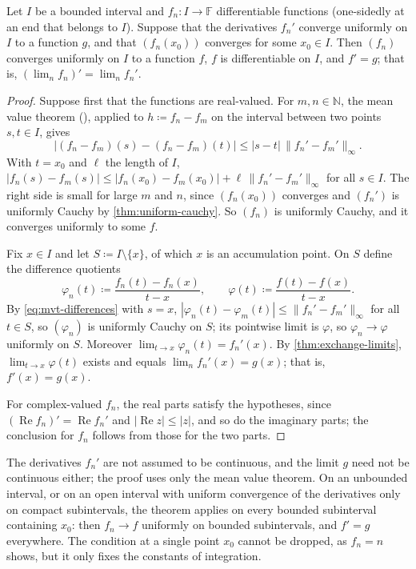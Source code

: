 \begin{theorem}
\label{thm:uniform-derivative}
Let $I$ be a bounded interval and $f_n\colon I\to\mathbb F$ differentiable functions (one-sidedly at an end that belongs to $I$). Suppose that the derivatives $f_n'$ converge uniformly on $I$ to a function $g$, and that $(f_n(x_0))$ converges for some $x_0\in I$. Then $(f_n)$ converges uniformly on $I$ to a function $f$, $f$ is differentiable on $I$, and $f'=g$; that is, $(\lim_nf_n)'=\lim_nf_n'$.
\end{theorem}

\begin{proof}
Suppose first that the functions are real-valued. For $m,n\in\mathbb N$, the mean value theorem (), applied to $h\coloneqq f_n-f_m$ on the interval between two points $s,t\in I$, gives
\begin{equation}
\bigl|(f_n-f_m)(s)-(f_n-f_m)(t)\bigr|\le|s-t|\,\|f_n'-f_m'\|_\infty .
\label{eq:mvt-differences}
\end{equation}
With $t=x_0$ and $\ell$ the length of $I$, $|f_n(s)-f_m(s)|\le|f_n(x_0)-f_m(x_0)|+\ell\,\|f_n'-f_m'\|_\infty$ for all $s\in I$. The right side is small for large $m$ and $n$, since $(f_n(x_0))$ converges and $(f_n')$ is uniformly Cauchy by \cref{thm:uniform-cauchy}. So $(f_n)$ is uniformly Cauchy, and it converges uniformly to some $f$.

Fix $x\in I$ and let $S\coloneqq I\setminus\{x\}$, of which $x$ is an accumulation point. On $S$ define the difference quotients
\[
\varphi_n(t)\coloneqq\frac{f_n(t)-f_n(x)}{t-x},\qquad\varphi(t)\coloneqq\frac{f(t)-f(x)}{t-x} .
\]
By \eqref{eq:mvt-differences} with $s=x$, $|\varphi_n(t)-\varphi_m(t)|\le\|f_n'-f_m'\|_\infty$ for all $t\in S$, so $(\varphi_n)$ is uniformly Cauchy on $S$; its pointwise limit is $\varphi$, so $\varphi_n\to\varphi$ uniformly on $S$. Moreover $\lim_{t\to x}\varphi_n(t)=f_n'(x)$. By \cref{thm:exchange-limits}, $\lim_{t\to x}\varphi(t)$ exists and equals $\lim_nf_n'(x)=g(x)$; that is, $f'(x)=g(x)$.

For complex-valued $f_n$, the real parts satisfy the hypotheses, since $(\operatorname{Re}f_n)'=\operatorname{Re}f_n'$ and $|\operatorname{Re}z|\le|z|$, and so do the imaginary parts; the conclusion for $f_n$ follows from those for the two parts.
\end{proof}

The derivatives $f_n'$ are not assumed to be continuous, and the limit $g$ need not be continuous either; the proof uses only the mean value theorem. On an unbounded interval, or on an open interval with uniform convergence of the derivatives only on compact subintervals, the theorem applies on every bounded subinterval containing $x_0$: then $f_n\to f$ uniformly on bounded subintervals, and $f'=g$ everywhere. The condition at a single point $x_0$ cannot be dropped, as $f_n=n$ shows, but it only fixes the constants of integration.

